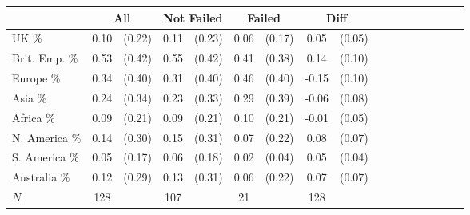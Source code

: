 {
\def\sym#1{\ifmmode^{#1}\else\(^{#1}\)\fi}
\begin{tabular}{l*{4}{cccc}}
\toprule
          &\multicolumn{2}{c}{All}&\multicolumn{2}{c}{Not Failed}&\multicolumn{2}{c}{Failed}&\multicolumn{2}{c}{Diff}\\
\midrule
UK \%     &     0.10&   (0.22)&     0.11&   (0.23)&     0.06&   (0.17)&     0.05&   (0.05)   \\
Brit. Emp. \%&     0.53&   (0.42)&     0.55&   (0.42)&     0.41&   (0.38)&     0.14&   (0.10)   \\
Europe \% &     0.34&   (0.40)&     0.31&   (0.40)&     0.46&   (0.40)&    -0.15&   (0.10)   \\
Asia \%   &     0.24&   (0.34)&     0.23&   (0.33)&     0.29&   (0.39)&    -0.06&   (0.08)   \\
Africa \% &     0.09&   (0.21)&     0.09&   (0.21)&     0.10&   (0.21)&    -0.01&   (0.05)   \\
N. America \%&     0.14&   (0.30)&     0.15&   (0.31)&     0.07&   (0.22)&     0.08&   (0.07)   \\
S. America \%&     0.05&   (0.17)&     0.06&   (0.18)&     0.02&   (0.04)&     0.05&   (0.04)   \\
Australia \%&     0.12&   (0.29)&     0.13&   (0.31)&     0.06&   (0.22)&     0.07&   (0.07)   \\
\midrule
\(N\)     &      128&         &      107&         &       21&         &      128&            \\
\bottomrule
\end{tabular}
}
